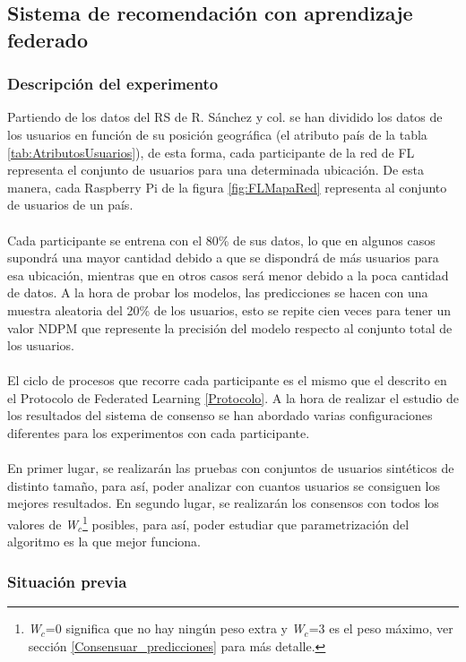 \subsection{Sistema de recomendación con aprendizaje federado}

\subsubsection{Descripción del experimento}
Partiendo de los datos del RS de R. Sánchez y col. se han dividido los datos de los usuarios en función de su posición geográfica (el atributo país de la tabla \ref{tab:AtributosUsuarios}), de esta forma, cada participante de la red de FL representa el conjunto de usuarios para una determinada ubicación. De esta manera, cada Raspberry Pi de la figura \ref{fig:FLMapaRed} representa al conjunto de usuarios de un país.
\\\\
Cada participante se entrena con el 80\% de sus datos, lo que en algunos casos supondrá una mayor cantidad debido a que se dispondrá de más usuarios para esa ubicación, mientras que en otros casos será menor debido a la poca cantidad de datos. A la hora de probar los modelos, las predicciones se hacen con una muestra aleatoria del 20\% de los usuarios, esto se repite cien veces para tener un valor NDPM que represente la precisión del modelo respecto al conjunto total de los usuarios.
\\ \\
El ciclo de procesos que recorre cada participante es el mismo que el descrito en el Protocolo de Federated Learning \ref{Protocolo}. A la hora de realizar el estudio de los resultados del sistema de consenso se han abordado varias configuraciones diferentes para los experimentos con cada participante.
\\\\
En primer lugar, se realizarán las pruebas con conjuntos de usuarios sintéticos de distinto tamaño, para así, poder analizar con cuantos usuarios se consiguen los mejores resultados. En segundo lugar, se realizarán los consensos con todos los valores de \textit{W$_c$}\footnote{\textit{W$_c$}=0 significa que no hay ningún peso extra y \textit{W$_c$}=3 es el peso máximo, ver sección \ref{Consensuar_predicciones} para más detalle.} posibles, para así, poder estudiar que parametrización del algoritmo es la que mejor funciona.

\subsubsection{Situación previa}

